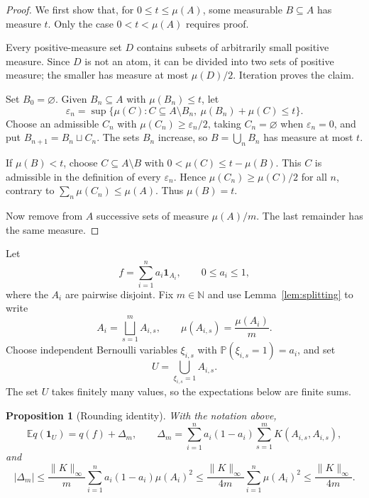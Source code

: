 \documentclass[10pt,a4paper]{amsart}
\newtheorem{proposition}[theorem]{Proposition}
\newcommand{\one}{\mathbf 1}
\newcommand{\E}{\mathbb E}
\newcommand{\N}{\mathbb N}
\newcommand{\norminf}[1]{\lVert #1\rVert_\infty}
\begin{document}
\begin{proof}
We first show that, for $0\leq t\leq\mu(A)$, some measurable $B\subseteq A$
has measure $t$. Only the case $0<t<\mu(A)$ requires proof.

Every positive-measure set $D$ contains subsets of arbitrarily small positive
measure. Since $D$ is not an atom, it can be divided into two sets of positive
measure; the smaller has measure at most $\mu(D)/2$. Iteration proves the
claim.

Set $B_0=\varnothing$. Given $B_n\subseteq A$ with $\mu(B_n)\leq t$, let
\[
  \varepsilon_n=
  \sup\{\mu(C):C\subseteq A\setminus B_n,\ 
                    \mu(B_n)+\mu(C)\leq t\}.
\]
Choose an admissible $C_n$ with $\mu(C_n)\geq\varepsilon_n/2$, taking
$C_n=\varnothing$ when $\varepsilon_n=0$, and put
$B_{n+1}=B_n\sqcup C_n$. The sets $B_n$ increase, so
$B=\bigcup_nB_n$ has measure at most $t$.

If $\mu(B)<t$, choose
$C\subseteq A\setminus B$ with $0<\mu(C)\leq t-\mu(B)$. This $C$ is
admissible in the definition of every $\varepsilon_n$. Hence
$\mu(C_n)\geq\mu(C)/2$ for all $n$, contrary to
$\sum_n\mu(C_n)\leq\mu(A)$. Thus $\mu(B)=t$.

Now remove from $A$ successive sets of measure $\mu(A)/m$. The last remainder
has the same measure.
\end{proof}

Let
\begin{equation}\label{eq:simple-f}
  f=\sum_{i=1}^n a_i\one_{A_i},
  \qquad 0\leq a_i\leq1,
\end{equation}
where the $A_i$ are pairwise disjoint. Fix $m\in\N$ and use
Lemma~\ref{lem:splitting} to write
\begin{equation}\label{eq:block-split}
  A_i=\bigsqcup_{s=1}^mA_{i,s},
  \qquad
  \mu(A_{i,s})=\frac{\mu(A_i)}m.
\end{equation}
Choose independent Bernoulli variables $\xi_{i,s}$ with
$\mathbb P(\xi_{i,s}=1)=a_i$, and set
\begin{equation}\label{eq:random-U}
  U=\bigcup_{\xi_{i,s}=1}A_{i,s}.
\end{equation}
The set $U$ takes finitely many values, so the expectations below are finite
sums.

\begin{proposition}[Rounding identity]\label{prop:rounding}
With the notation above,
\begin{equation}\label{eq:rounding-identity}
  \E q(\one_U)=q(f)+\Delta_m,
  \qquad
  \Delta_m=\sum_{i=1}^n a_i(1-a_i)
      \sum_{s=1}^mK(A_{i,s},A_{i,s}),
\end{equation}
and
\begin{equation}\label{eq:error-bound}
  |\Delta_m|
  \leq \frac{\norminf{K}}m
         \sum_{i=1}^n a_i(1-a_i)\mu(A_i)^2
  \leq \frac{\norminf{K}}{4m}
         \sum_{i=1}^n\mu(A_i)^2
  \leq \frac{\norminf{K}}{4m}.
\end{equation}
\end{proposition}
\end{document}
